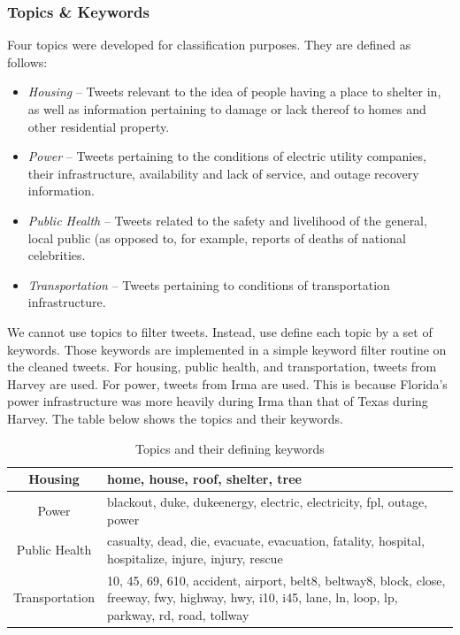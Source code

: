 \documentclass[12pt, a4paper]{article}
\begin{document}
\subsubsection{Topics \& Keywords}
    Four topics were developed for classification purposes. They are defined as follows:
    \begin{itemize}
        \item \textit{Housing} -- Tweets relevant to the idea of people having a place to shelter in, as well as information pertaining to damage or lack thereof to homes and other residential property.
        \item \textit{Power} -- Tweets pertaining to the conditions of electric utility companies, their infrastructure, availability and lack of service, and outage recovery information.
        \item \textit{Public Health} -- Tweets related to the safety and livelihood of the general, local public (as opposed to, for example, reports of deaths of national celebrities.
        \item \textit{Transportation} -- Tweets pertaining to conditions of transportation infrastructure.
    \end{itemize}
    We cannot use topics to filter tweets. Instead, use define each topic by a set of keywords. Those keywords are implemented in a simple keyword filter routine on the cleaned tweets. For housing, public health, and transportation, tweets from Harvey are used. For power, tweets from Irma are used. This is because Florida's power infrastructure was more heavily during Irma than that of Texas during Harvey. The table below shows the topics and their keywords.
    \begin{table}[h]
    \centering
    \begin{tabular}{|c|p{6cm}|}
        \hline
        Housing & home, house, roof, shelter, tree\\ \hline
        Power & blackout, duke, dukeenergy, electric, electricity, fpl, outage, power\\ \hline
        Public Health & casualty, dead, die, evacuate, evacuation, fatality, hospital, hospitalize, injure, injury, rescue\\ \hline
        Transportation & 10, 45, 69, 610, accident, airport, belt8, beltway8, block, close, freeway, fwy, highway, hwy, i10, i45, lane, ln, loop, lp, parkway, rd, road, tollway\\ \hline
    \end{tabular}
    \caption{Topics and their defining keywords}
    \end{table}
    
\end{document}
